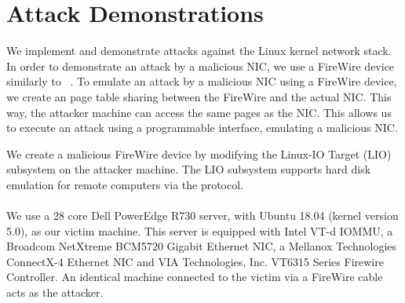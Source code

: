 \section{Attack Demonstrations}\label{Sec:setup}


We implement and demonstrate \compound attacks against the Linux kernel network stack. 
In order to demonstrate an attack by a malicious NIC, we use a FireWire device similarly to \DIFaddbegin {}\DIFaddend ~\cite{SLND10}. To emulate an attack by a malicious NIC using a FireWire device, we create an \iova{} page table sharing between the FireWire and the actual NIC. \DIFdelbegin {}\DIFdelend This way, the attacker machine can access the same pages as the NIC. This allows us to execute an attack using a programmable interface, emulating a malicious NIC.
\DIFdelbegin {}\DIFdelend 


We create a malicious FireWire device by modifying the Linux-IO Target (LIO) subsystem on the attacker machine. The LIO subsystem supports hard disk emulation for remote computers via the \spb{} protocol. 
\DIFdelbegin {}%
\DIFdelend 

\DIFdelbegin \paragraph{}
\addtocounter{paragraph}{-1}%
\DIFdelend \DIFaddbegin \smallskip
\noindent\textbf{}
\DIFaddend We use a 28 core Dell PowerEdge R730 server, with Ubuntu 18.04 (kernel version 5.0), as our victim machine. This server is equipped with \DIFaddbegin {}\DIFaddend Intel VT-d IOMMU, a Broadcom NetXtreme BCM5720 Gigabit Ethernet NIC, a Mellanox Technologies ConnectX-4 Ethernet NIC and VIA Technologies, Inc. VT6315 Series Firewire Controller. An identical machine connected to the victim via a FireWire cable acts as the attacker. 
\DIFaddbegin 

